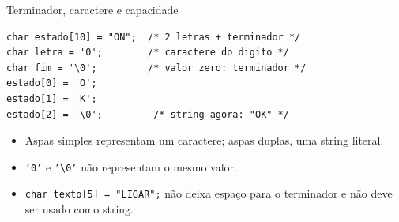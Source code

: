 \begin{frame}[fragile]{Terminador, caractere e capacidade}
\begin{lstlisting}
char estado[10] = "ON";  /* 2 letras + terminador */
char letra = '0';        /* caractere do digito */
char fim = '\0';         /* valor zero: terminador */
estado[0] = 'O';
estado[1] = 'K';
estado[2] = '\0';         /* string agora: "OK" */
\end{lstlisting}
\begin{itemize}
\item Aspas simples representam um caractere; aspas duplas, uma string literal.
\item \texttt{'0'} e \texttt{'\textbackslash 0'} não representam o mesmo valor.
\item \texttt{char texto[5] = "LIGAR";} não deixa espaço para o terminador e não deve ser usado como string.
\end{itemize}
\end{frame}

